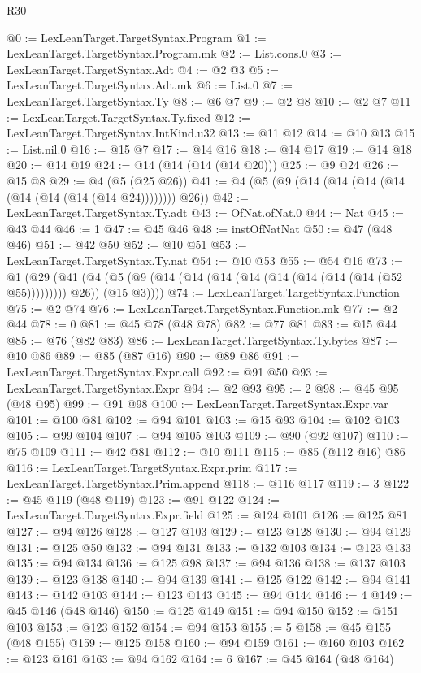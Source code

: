 \begin{lexlean}{R30}
\begin{coremodule}
@0 := LexLeanTarget.TargetSyntax.Program
@1 := LexLeanTarget.TargetSyntax.Program.mk
@2 := List.cons.{0}
@3 := LexLeanTarget.TargetSyntax.Adt
@4 := @2 @3
@5 := LexLeanTarget.TargetSyntax.Adt.mk
@6 := List.{0}
@7 := LexLeanTarget.TargetSyntax.Ty
@8 := @6 @7
@9 := @2 @8
@10 := @2 @7
@11 := LexLeanTarget.TargetSyntax.Ty.fixed
@12 := LexLeanTarget.TargetSyntax.IntKind.u32
@13 := @11 @12
@14 := @10 @13
@15 := List.nil.{0}
@16 := @15 @7
@17 := @14 @16
@18 := @14 @17
@19 := @14 @18
@20 := @14 @19
@24 := @14 (@14 (@14 (@14 @20)))
@25 := @9 @24
@26 := @15 @8
@29 := @4 (@5 (@25 @26))
@41 := @4 (@5 (@9 (@14 (@14 (@14 (@14 (@14 (@14 (@14 (@14 @24)))))))) @26))
@42 := LexLeanTarget.TargetSyntax.Ty.adt
@43 := OfNat.ofNat.{0}
@44 := Nat
@45 := @43 @44
@46 := 1
@47 := @45 @46
@48 := instOfNatNat
@50 := @47 (@48 @46)
@51 := @42 @50
@52 := @10 @51
@53 := LexLeanTarget.TargetSyntax.Ty.nat
@54 := @10 @53
@55 := @54 @16
@73 := @1
    (@29
      (@41 (@4 (@5 (@9 (@14 (@14 (@14 (@14 (@14 (@14 (@14 (@14 (@52 @55))))))))) @26)) (@15 @3))))
@74 := LexLeanTarget.TargetSyntax.Function
@75 := @2 @74
@76 := LexLeanTarget.TargetSyntax.Function.mk
@77 := @2 @44
@78 := 0
@81 := @45 @78 (@48 @78)
@82 := @77 @81
@83 := @15 @44
@85 := @76 (@82 @83)
@86 := LexLeanTarget.TargetSyntax.Ty.bytes
@87 := @10 @86
@89 := @85 (@87 @16)
@90 := @89 @86
@91 := LexLeanTarget.TargetSyntax.Expr.call
@92 := @91 @50
@93 := LexLeanTarget.TargetSyntax.Expr
@94 := @2 @93
@95 := 2
@98 := @45 @95 (@48 @95)
@99 := @91 @98
@100 := LexLeanTarget.TargetSyntax.Expr.var
@101 := @100 @81
@102 := @94 @101
@103 := @15 @93
@104 := @102 @103
@105 := @99 @104
@107 := @94 @105 @103
@109 := @90 (@92 @107)
@110 := @75 @109
@111 := @42 @81
@112 := @10 @111
@115 := @85 (@112 @16) @86
@116 := LexLeanTarget.TargetSyntax.Expr.prim
@117 := LexLeanTarget.TargetSyntax.Prim.append
@118 := @116 @117
@119 := 3
@122 := @45 @119 (@48 @119)
@123 := @91 @122
@124 := LexLeanTarget.TargetSyntax.Expr.field
@125 := @124 @101
@126 := @125 @81
@127 := @94 @126
@128 := @127 @103
@129 := @123 @128
@130 := @94 @129
@131 := @125 @50
@132 := @94 @131
@133 := @132 @103
@134 := @123 @133
@135 := @94 @134
@136 := @125 @98
@137 := @94 @136
@138 := @137 @103
@139 := @123 @138
@140 := @94 @139
@141 := @125 @122
@142 := @94 @141
@143 := @142 @103
@144 := @123 @143
@145 := @94 @144
@146 := 4
@149 := @45 @146 (@48 @146)
@150 := @125 @149
@151 := @94 @150
@152 := @151 @103
@153 := @123 @152
@154 := @94 @153
@155 := 5
@158 := @45 @155 (@48 @155)
@159 := @125 @158
@160 := @94 @159
@161 := @160 @103
@162 := @123 @161
@163 := @94 @162
@164 := 6
@167 := @45 @164 (@48 @164)

\end{coremodule}
\end{lexlean}
